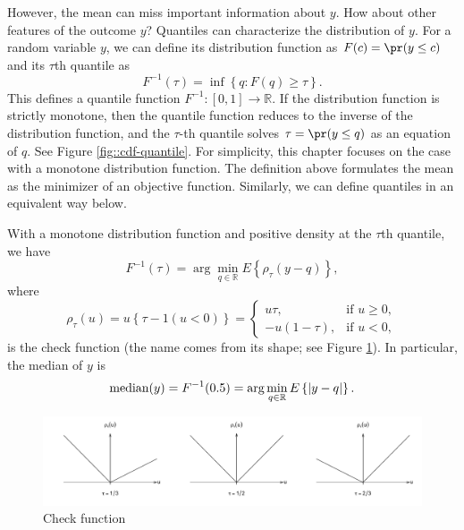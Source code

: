 However, the mean can miss important information about $y$. How about other features of the outcome $y$? Quantiles can
characterize the distribution of $y$. For a random variable $y$,
we can define its distribution function as $F(c)=\pr(y\leq c)$ and
its $\tau$th quantile as
\[
F^{-1}(\tau)=\inf\left\{ q:F(q)\geq\tau\right\} .
\]
This defines a quantile function $F^{-1}:[0,1]\rightarrow\mathbb{R}$.
If the distribution function is strictly monotone, then the quantile
function reduces to the inverse of the distribution function, and the $\tau$-th quantile solves $\tau=\pr(y\leq q)$ as an equation of $q$.
See Figure \ref{fig::cdf-quantile}. For simplicity, this chapter focuses on the case with a  monotone distribution
function. The definition above formulates the mean as the minimizer of an objective function. Similarly, we can define quantiles in an equivalent
way below.
\begin{proposition}
\label{proposition:definitionofquantile}With a monotone distribution function
and positive density at the $\tau$th quantile, we have
\[
F^{-1}(\tau)=\arg\min_{q \in \mathbb{R} }E\left\{ \rho_{\tau}(y-q)\right\} ,
\]
where 
\[
\rho_{\tau}(u)=u\left\{ \tau-1(u<0)\right\} =\begin{cases}
u\tau, & \text{if }u\geq0,\\
-u(1-\tau), & \text{if }u<0,
\end{cases}
\]
is the check function (the name comes from its shape; see Figure \ref{fig::check-function}). In particular,
the median of $y$ is 
\[
\textup{median}(y)=F^{-1}(0.5)=\arg\min_{q \in \mathbb{R}}E\left\{ |y-q|\right\} .
\]
\end{proposition}
%
\begin{figure}
\includegraphics[width=\textwidth]{figures/checkfunctionplot}
\caption{Check function}\label{fig::check-function}
\end{figure}

